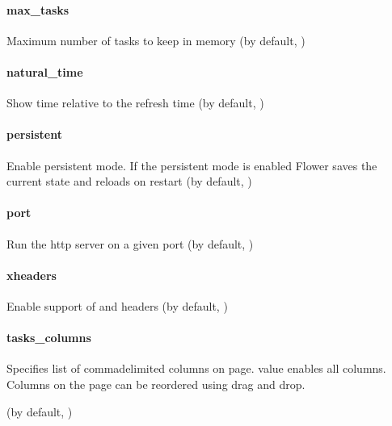 \documentclass[letterpaper,10pt,english]{sphinxmanual}
\begin{document}
\paragraph{max\_tasks}
\label{\detokenize{config:max-tasks}}\label{\detokenize{config:id16}}
Maximum number of tasks to keep in memory (by default, )


\paragraph{natural\_time}
\label{\detokenize{config:natural-time}}\label{\detokenize{config:id17}}
Show time relative to the refresh time (by default, )


\paragraph{persistent}
\label{\detokenize{config:persistent}}\label{\detokenize{config:id18}}
Enable persistent mode. If the persistent mode is enabled Flower saves
the current state and reloads on restart (by default, )


\paragraph{port}
\label{\detokenize{config:port}}\label{\detokenize{config:id19}}
Run the http server on a given port (by default, )


\paragraph{xheaders}
\label{\detokenize{config:xheaders}}\label{\detokenize{config:id20}}
Enable support of  and  headers
(by default, )


\paragraph{tasks\_columns}
\label{\detokenize{config:tasks-columns}}\label{\detokenize{config:id21}}
Specifies list of comma\sphinxhyphen{}delimited columns on  page.  value
enables all columns. Columns on the page can be reordered using drag and drop.

(by default, )
\end{document}
